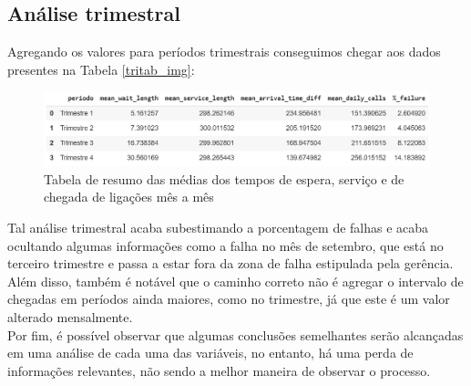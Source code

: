 \subsection{Análise trimestral}
Agregando os valores para períodos trimestrais conseguimos chegar aos dados presentes na Tabela \ref*{tritab_img}:\\

\begin{figure}[H]
    \includegraphics{analise-de-dados/trimestral/tritab.png}
    \caption{Tabela de resumo das médias dos tempos de espera, serviço e de chegada de ligações mês a mês}
    \label{fig: tritab_img}
\end{figure}

Tal análise trimestral acaba subestimando a porcentagem de falhas e acaba ocultando algumas informações como a falha no mês de setembro, que está no terceiro trimestre e passa a estar fora da zona de falha estipulada pela gerência.\\
Além disso, também é notável que o caminho correto não é agregar o intervalo de chegadas em períodos ainda maiores, como no trimestre, já que este é um valor alterado mensalmente.\\
Por fim, é possível observar que algumas conclusões semelhantes serão alcançadas em uma análise de cada uma das variáveis, no entanto, há uma perda de informações relevantes, não sendo a melhor maneira de observar o processo.\\